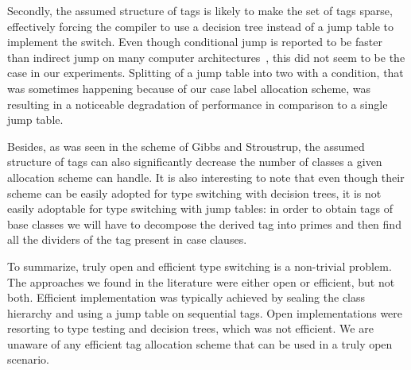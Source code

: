 \documentclass[preprint]{sigplanconf}
\makeatletter
\DeclareRobustCommand{\code}[1]{{\lstinline[breaklines=false,escapechar=@]{#1}}}
\makeatother
\begin{document}
Secondly, the assumed structure of tags is likely to make the set of tags 
sparse, effectively forcing the compiler to use a decision tree instead of a jump 
table to implement the switch. Even though conditional jump is reported to be 
faster than indirect jump on many computer architectures~\cite[]{garrigue-98}, this did not seem to be the case in our experiments. Splitting 
of a jump table into two with a condition, that was sometimes happening because 
of our case label allocation scheme, was resulting in a noticeable degradation of 
performance in comparison to a single jump table.

Besides, as was seen in the scheme of Gibbs and Stroustrup, the assumed 
structure of tags can also significantly decrease the number of classes a given 
allocation scheme can handle. It is also interesting to note that even though 
their scheme can be easily adopted for type switching with decision trees, it is 
not easily adoptable for type switching with jump tables: in order to obtain 
tags of base classes we will have to decompose the derived tag into primes and 
then find all the dividers of the tag present in case clauses.

To summarize, truly open and efficient type switching is a non-trivial problem. 
The approaches we found in the literature were either open or efficient, 
but not both. Efficient implementation was typically achieved by sealing the 
class hierarchy and using a jump table on sequential tags. Open implementations 
were resorting to type testing and decision trees, which was not efficient. 
We are unaware of any efficient tag allocation scheme that can be used in a 
truly open scenario.


%

%
\end{document}
